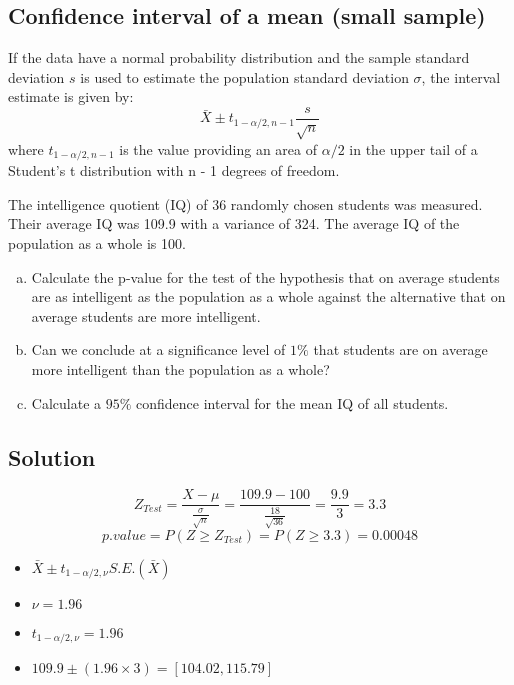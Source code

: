 \documentclass[a4paper,12pt]{article}
\begin{document}
\subsection{Confidence interval of a mean (small sample)}

If the data have a normal probability distribution and the sample
standard deviation $s$ is used to estimate the population
standard deviation $\sigma$, the interval estimate is given by:
\begin{equation}
\bar{X} \pm t_{1-\alpha/2,n-1}\frac{s}{\sqrt{n}}
\end{equation}
where $t_{1-\alpha/2,n-1}$ is the value providing an area of $\alpha/2$ in the upper tail of a Student’s t distribution with n - 1 degrees of freedom.


The intelligence quotient (IQ) of 36 randomly chosen students was measured.
Their average IQ was 109.9 with a variance of 324.
The average IQ of the population as a whole is 100.
\begin{enumerate}[(a)]
\item Calculate the p-value for the test of the hypothesis that on average
students are as intelligent as the population as a whole against the alternative that on average students are more intelligent.
\item Can we conclude at a significance level of $1\%$ that students are on average more intelligent than the population as a whole?
\item Calculate a $95\%$ confidence interval for the mean IQ of all students.
\end{enumerate}

\subsection*{Solution}

\[Z_{Test} = \frac{X- \mu}{\frac{\sigma}{\sqrt{n}}} = \frac{109.9 - 100}{\frac{18}{\sqrt{36}}} = \frac{9.9}{3} = 3.3\]
\[p.value = P(Z \geq Z_{Test}) = P(Z \geq 3.3) = 0.00048\]


\begin{itemize}
\item $\bar{X} \pm t_{1-\alpha/2,\nu}S.E.(\bar{X})$
\item $\nu = 1.96$
\item $t_{1-\alpha/2,\nu} = 1.96$
\item $109.9 \pm (1.96 \times 3) = [104.02, 115.79]$
\end{itemize}

\end{document}
